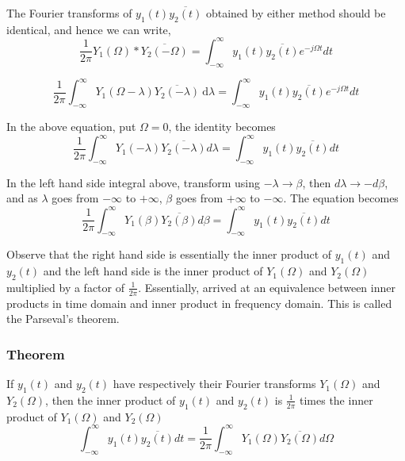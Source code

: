 The Fourier transforms of $y_1(t)\overline{y_2(t)}$  obtained by either method should be identical, and hence we can write,
\[
\frac{1}{2\pi} { Y_1(\Omega)
 \ast \overline{Y_2(-\Omega)}} = 
\int_{-\infty}^{\infty}
{ y_1(t)\overline{y_2(t)} e^{-j\Omega t}dt }
\]

\[
\frac{1}{2\pi}
\int_{-\infty}^{\infty} \!
{Y_1(\Omega - \lambda)\overline{Y_2(-\lambda)}\ \mathrm{d}\lambda}
= 
\int_{-\infty}^{\infty}
{ y_1(t)\overline{y_2(t)} e^{-j\Omega t}dt }
\]

In the above equation, put $\Omega  =0$, the identity becomes
\[
\frac{1}{2\pi}
\int_{-\infty}^{\infty}
{Y_1(-\lambda)\overline{Y_2(-\lambda)}d\lambda}
= 
\int_{-\infty}^{\infty}
{ y_1(t)\overline{y_2(t)}dt }
\]

In the left hand side integral above, transform using $-\lambda \rightarrow \beta$, then
$d\lambda \rightarrow -d\beta$, and as $\lambda$ goes from $-\infty$ to $+\infty$, $\beta$ goes from $+\infty$ to $-\infty$. 
The equation becomes
\[
\frac{1}{2\pi} 
\int_{-\infty}^{\infty}
{ Y_1(\beta) 
\overline{Y_2(\beta)} d\beta } = \int_{-\infty}^{\infty}
{ y_1(t) \overline{y_2(t)}  dt } 
\]

Observe that the right hand side is essentially the inner product of $y_1(t)$ and $y_2(t)$  and the left hand side is the inner product of $Y_1(\Omega)$ and   $Y_2(\Omega)$ multiplied by a factor of $\frac{1}{2\pi}$.  Essentially, arrived at an equivalence between inner products in time domain and inner product in frequency domain. This is called the Parseval's theorem. 

\subsubsection*{Theorem}
If $y_1(t)$ and $y_2(t)$ have respectively their Fourier transforms $Y_1(\Omega)$ and $Y_2(\Omega)$, then the inner product of $y_1(t)$ and $y_2(t)$ is $\frac{1}{2\pi}$ times the inner product of $Y_1(\Omega)$ and $Y_2(\Omega)$
\[
\int_{-\infty}^{\infty}
{ y_1(t) \overline{y_2(t)} dt }  = \frac{1}{2\pi} 
\int_{-\infty}^{\infty}
{ Y_1(\Omega) \overline{Y_2(\Omega)} d\Omega }
\]









                



                     
